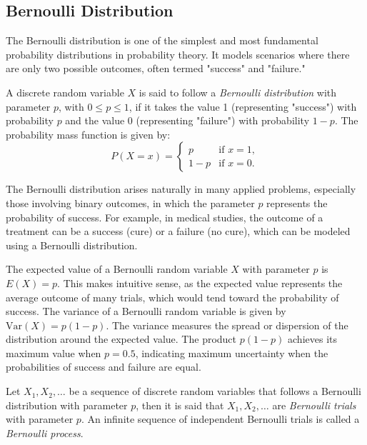%
%

\subsection{Bernoulli Distribution}

The Bernoulli distribution is one of the simplest and most fundamental probability distributions in probability theory. It models scenarios where there are only two possible outcomes, often termed "success" and "failure."

\begin{definition}
A discrete random variable $X$ is said to follow a \emph{Bernoulli distribution} with parameter $p$, with $0 \leq p \leq 1$, if it takes the value 1 (representing "success") with probability $p$ and the value 0 (representing "failure") with probability $1-p$. The probability mass function is given by:
\[
P(X = x) = 
\begin{cases} 
p & \text{if } x = 1, \\
1 - p & \text{if } x = 0.
\end{cases}
\]
\end{definition}

The Bernoulli distribution arises naturally in many applied problems, especially those involving binary outcomes, in which the parameter $p$ represents the probability of success. For example, in medical studies, the outcome of a treatment can be a success (cure) or a failure (no cure), which can be modeled using a Bernoulli distribution.

The expected value of a Bernoulli random variable $X$ with parameter $p$ is $E(X) = p$. This makes intuitive sense, as the expected value represents the average outcome of many trials, which would tend toward the probability of success. The variance of a Bernoulli random variable is given by $\text{Var}(X) = p(1 - p)$. The variance measures the spread or dispersion of the distribution around the expected value. The product $p(1 - p)$ achieves its maximum value when $p = 0.5$, indicating maximum uncertainty when the probabilities of success and failure are equal.

\begin{definition}
Let $X_{1}, X_{2}, \ldots$ be a sequence of discrete random variables that follows a Bernoulli distribution with parameter $p$, then it is said that $X_{1}, X_{2}, \ldots$ are \emph{Bernoulli trials} with parameter $p$. An infinite sequence of independent Bernoulli trials is called a \emph{Bernoulli process}.
\end{definition}

